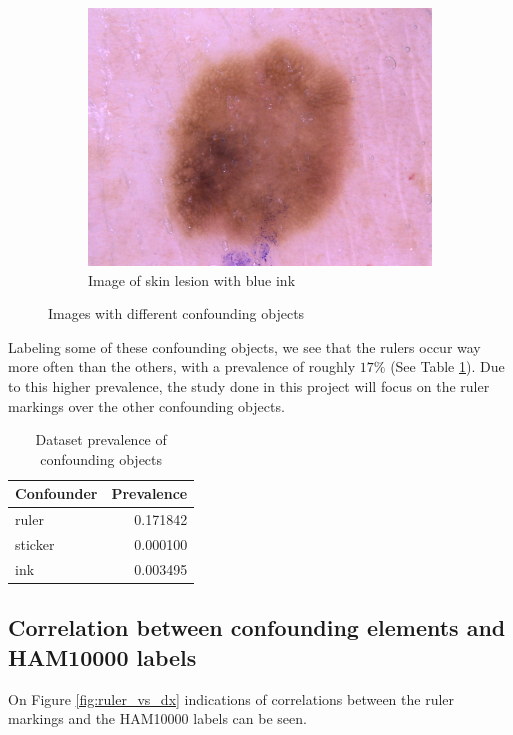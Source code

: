 \begin{figure}[ht]
\begin{center}
\begin{subfigure}[b]{0.3\textwidth}
            \includegraphics[width=\textwidth]{./images/ISIC_0027514.jpg}
            \caption{Image of skin lesion with blue ink}
        \end{subfigure}
    \end{center}
    \caption{Images with different confounding objects}
    \label{fig:confounding_objects}
\end{figure}

Labeling some of these confounding objects, we see that the rulers occur way more often than the others, with a prevalence of roughly $17\%$ (See Table \ref{table:confounding_objects}).
Due to this higher prevalence, the study done in this project will focus on the ruler markings over the other confounding objects.

\begin{table}
    \centering
    \begin{tabular}{|l|r|}
        \hline 
        Confounder &  Prevalence \\ \hline
        ruler   &  0.171842 \\ \hline
        sticker &  0.000100 \\ \hline
        ink     &  0.003495 \\ \hline
    \end{tabular}
    \caption{Dataset prevalence of confounding objects}
    \label{table:confounding_objects}
\end{table}

\subsection{Correlation between confounding elements and HAM10000 labels}
On Figure \ref{fig:ruler_vs_dx} indications of correlations between the ruler markings and the HAM10000 labels can be seen.

